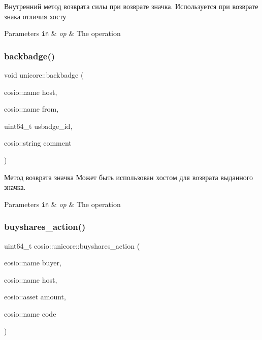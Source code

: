 Внутренний метод возврата силы при возврате значка. Используется при возврате знака отличия хосту 


\begin{DoxyParams}[1]{Parameters}
\mbox{\tt in}  & {\em op} & The operation \\
\hline
\end{DoxyParams}
\mbox{\label{classeosio_1_1unicore_a6e7db779eb5836300fabe105012388c2}} 
\subsubsection{\texorpdfstring{backbadge()}{backbadge()}}
{\footnotesize\ttfamily void unicore\+::backbadge (\begin{DoxyParamCaption}\item[{eosio\+::name}]{host,  }\item[{eosio\+::name}]{from,  }\item[{uint64\+\_\+t}]{usbadge\+\_\+id,  }\item[{eosio\+::string}]{comment }\end{DoxyParamCaption})}



Метод возврата значка Может быть использован хостом для возврата выданного значка. 


\begin{DoxyParams}[1]{Parameters}
\mbox{\tt in}  & {\em op} & The operation \\
\hline
\end{DoxyParams}
\mbox{\label{classeosio_1_1unicore_a4e744b6a55f783f4f70a9d43a23daf98}} 
\subsubsection{\texorpdfstring{buyshares\+\_\+action()}{buyshares\_action()}}
{\footnotesize\ttfamily uint64\+\_\+t eosio\+::unicore\+::buyshares\+\_\+action (\begin{DoxyParamCaption}\item[{eosio\+::name}]{buyer,  }\item[{eosio\+::name}]{host,  }\item[{eosio\+::asset}]{amount,  }\item[{eosio\+::name}]{code }\end{DoxyParamCaption})\hspace{0.3cm}{\ttfamily [static]}}



